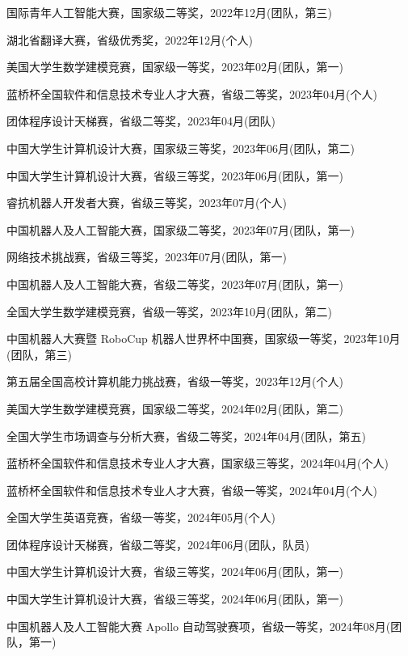 {\begin{enumerate}[label={[\arabic*]},wide=2em,itemsep=1pt,topsep=2pt]
  \item 国际青年人工智能大赛，国家级二等奖，2022年12月(团队，第三)
  \item 湖北省翻译大赛，省级优秀奖，2022年12月(个人)
  \item 美国大学生数学建模竞赛，国家级一等奖，2023年02月(团队，第一)
  \item 蓝桥杯全国软件和信息技术专业人才大赛，省级二等奖，2023年04月(个人)
  \item 团体程序设计天梯赛，省级二等奖，2023年04月(团队)
  \item 中国大学生计算机设计大赛，国家级三等奖，2023年06月(团队，第二)
  \item 中国大学生计算机设计大赛，省级三等奖，2023年06月(团队，第一)
  \item 睿抗机器人开发者大赛，省级三等奖，2023年07月(个人)
  \item 中国机器人及人工智能大赛，国家级二等奖，2023年07月(团队，第一)
  \item 网络技术挑战赛，省级三等奖，2023年07月(团队，第一)
  \item 中国机器人及人工智能大赛，省级二等奖，2023年07月(团队，第一)
  \item 全国大学生数学建模竞赛，省级一等奖，2023年10月(团队，第二)
  \item 中国机器人大赛暨 RoboCup 机器人世界杯中国赛，国家级一等奖，2023年10月(团队，第三)
  \item 第五届全国高校计算机能力挑战赛，省级一等奖，2023年12月(个人)
  \item 美国大学生数学建模竞赛，国家级二等奖，2024年02月(团队，第二)
  \item 全国大学生市场调查与分析大赛，省级二等奖，2024年04月(团队，第五)
  \item 蓝桥杯全国软件和信息技术专业人才大赛，国家级三等奖，2024年04月(个人)
  \item 蓝桥杯全国软件和信息技术专业人才大赛，省级一等奖，2024年04月(个人)
  \item 全国大学生英语竞赛，省级一等奖，2024年05月(个人)
  \item 团体程序设计天梯赛，省级二等奖，2024年06月(团队，队员)
  \item 中国大学生计算机设计大赛，省级三等奖，2024年06月(团队，第一)
  \item 中国大学生计算机设计大赛，省级三等奖，2024年06月(团队，第一)
  \item 中国机器人及人工智能大赛 Apollo 自动驾驶赛项，省级一等奖，2024年08月(团队，第一)

\end{enumerate}}
